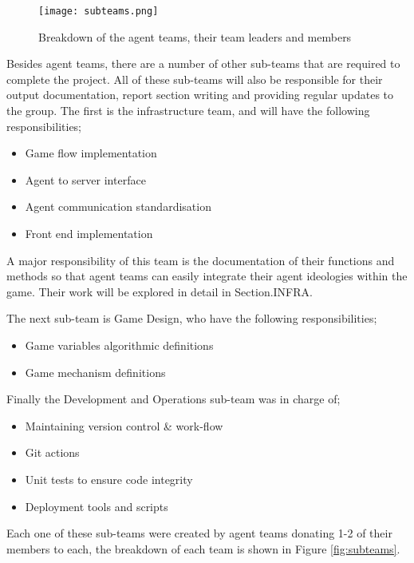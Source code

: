 \begin{figure}[htb]
    \centering
    \texttt{[image: subteams.png]}
    \caption{Breakdown of the agent teams, their team leaders and members}
    \label{fig:agentteams}
\end{figure}
    
Besides agent teams, there are a number of other sub-teams that are required to complete the project. All of these sub-teams will also be responsible for their output documentation, report section writing and providing regular updates to the group. 
The first is the infrastructure team, and will have the following responsibilities;

\begin{itemize}
    \item Game flow implementation
    \item Agent to server interface
    \item Agent communication standardisation
    \item Front end implementation
\end{itemize}

A major responsibility of this team is the documentation of their functions and methods so that agent teams can easily integrate their agent ideologies within the game. Their work will be explored in detail in Section.INFRA.

The next sub-team is Game Design, who have the following responsibilities;

\begin{itemize}
    \item Game variables algorithmic definitions
    \item Game mechanism definitions 
\end{itemize}

Finally the Development and Operations sub-team was in charge of;

\begin{itemize}
    \item Maintaining version control \& work-flow
    \item Git actions
    \item Unit tests to ensure code integrity
    \item Deployment tools and scripts
\end{itemize}

Each one of these sub-teams were created by agent teams donating 1-2 of their members to each, the breakdown of each team is shown in Figure \ref{fig:subteams}.

